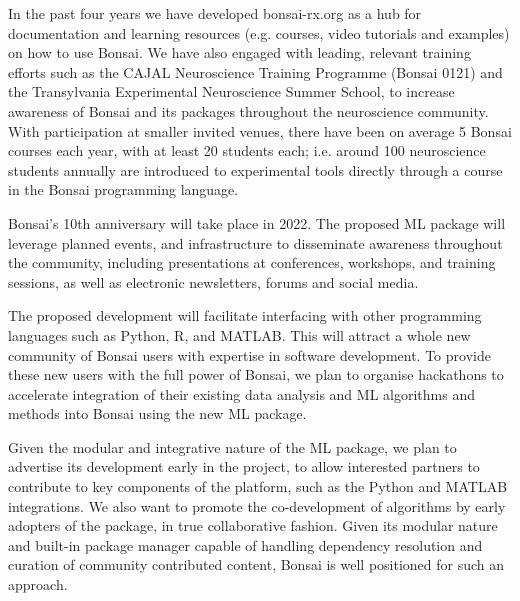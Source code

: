 In the past four years we have developed bonsai-rx.org as a hub for documentation and learning
resources (e.g. courses, video tutorials and examples) on how to use Bonsai. We have also engaged
with leading, relevant training efforts such as the CAJAL Neuroscience
Training Programme (Bonsai 0121) and the Transylvania Experimental Neuroscience
Summer School, to increase awareness of Bonsai and
its packages throughout the neuroscience community. With participation
at smaller invited venues, there have been on average 5 Bonsai courses
each year, with at least 20 students each; i.e.  around 100 neuroscience students annually are introduced to experimental tools directly through a
course in the Bonsai programming language.

Bonsai's 10th anniversary will take place in 2022. The proposed ML package will leverage planned events, and infrastructure to disseminate
awareness throughout the community, including presentations at conferences,
workshops, and training sessions, as well as electronic newsletters, forums and
social media.

The proposed development will facilitate interfacing with other programming languages
such as Python, R, and MATLAB. This will attract a whole new
community of Bonsai users with expertise in software development. To provide these new users with the full power of Bonsai,
we plan to organise hackathons to accelerate integration of their existing data
analysis and ML algorithms and methods into Bonsai using the new
ML package.

 Given the modular and integrative nature of the ML package, we
 plan to advertise its development early in the project, to allow interested
 partners to contribute to key
 components of the platform, such as the Python and MATLAB integrations. We
 also want to promote the co-development of algorithms by early adopters of the
 package, in true collaborative fashion. Given its modular nature and built-in
 package manager capable of handling dependency resolution and curation of
 community contributed content, Bonsai is well positioned for such an approach.

